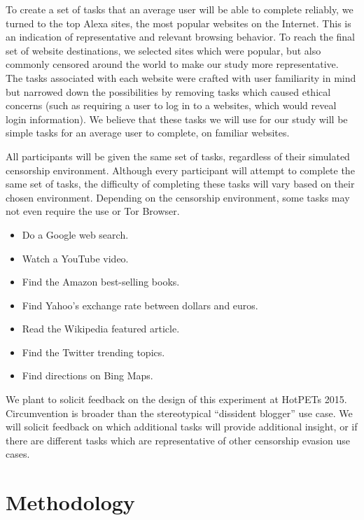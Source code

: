 \documentclass[letterpaper,twocolumn,11pt]{article}
\begin{document}
To create a set of tasks that an average user will be able to complete reliably, 
we turned to the top Alexa sites, the most popular websites on the Internet. This 
is an indication of representative and relevant browsing behavior. To reach the final
set of website destinations, we selected sites which were popular, but also commonly
censored around the world to make our study more representative. The tasks 
associated with each website were crafted with user familiarity in mind but narrowed 
down the possibilities by removing tasks which caused ethical concerns (such as 
requiring a user to log in to a websites, which would reveal login information).  
We believe that these tasks we will use for our study will be simple tasks for an average 
user to complete, on familiar websites. 

All participants will be given the same set of tasks, regardless of their simulated
censorship environment.  Although every participant will attempt to complete the same 
set of tasks, the difficulty of completing these tasks will vary based on their chosen environment. 
Depending on the censorship environment, some tasks may not even require the use or Tor Browser. 

\begin{itemize} \itemsep1pt \parskip0pt 
\item Do a Google web search.
\item Watch a YouTube video.
\item Find the Amazon best-selling books.
\item Find Yahoo's exchange rate between dollars and euros.
\item Read the Wikipedia featured article.
\item Find the Twitter trending topics.
\item Find directions on Bing Maps.
\end{itemize}


We plant to solicit feedback on the design of this experiment at HotPETs 2015. 
Circumvention is broader than the stereotypical ``dissident blogger'' 
use case. We will solicit feedback on which additional tasks will provide additional insight,
or if there are different tasks which are representative of other censorship evasion use cases.

\section{Methodology}  
\end{document}
